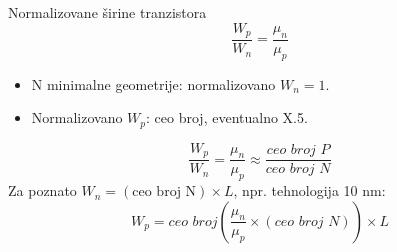 \begin{frame}[label=09_2-s046]{Normalizovane širine tranzistora}
\[\frac{W_p}{W_n}=\frac{\mu_n}{\mu_p}\]
\begin{itemize}
\item N minimalne geometrije: normalizovano $W_n=1$.
\item Normalizovano $W_p$: ceo broj, eventualno X.5.
\end{itemize}
\[\frac{W_p}{W_n}=\frac{\mu_n}{\mu_p}\approx\frac{\textit{ceo broj P}}{\textit{ceo broj N}}\]
Za poznato $W_n=(\text{ceo broj N})\times L$, npr. tehnologija 10 nm:\[W_p=\textit{ceo broj}\left(\frac{\mu_n}{\mu_p}\times(\textit{ceo broj N})\right)\times L\]

\end{frame}
